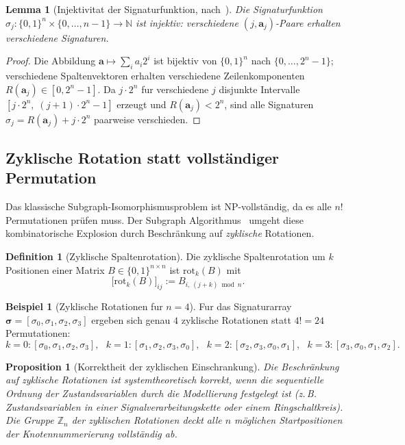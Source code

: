 \documentclass[a4paper, 12pt, twoside, openright]{report}
\newtheorem{lemma}[theorem]{Lemma}
\newtheorem{proposition}[theorem]{Proposition}
\theoremstyle{definition}
\newtheorem{definition}[theorem]{Definition}
\newtheorem{example}[theorem]{Beispiel}
\theoremstyle{definition}
\begin{document}
\begin{lemma}[Injektivitat der Signaturfunktion, nach~\citep{epp2026subgraph}]
\label{lem:injektivitaet}
Die Signaturfunktion $\sigma_j : \{0,1\}^n \times \{0,\ldots,n-1\} \to \mathbb{N}$
ist injektiv: verschiedene $(j, \bm{a}_j)$-Paare erhalten verschiedene Signaturen.
\end{lemma}

\begin{proof}
Die Abbildung $\bm{a} \mapsto \sum_i a_i 2^i$ ist bijektiv von $\{0,1\}^n$ nach
$\{0,\ldots,2^n-1\}$; verschiedene Spaltenvektoren erhalten verschiedene
Zeilenkomponenten $R(\bm{a}_j) \in [0, 2^n - 1]$.
Da $j \cdot 2^n$ fur verschiedene $j$ disjunkte Intervalle
$[j \cdot 2^n,\; (j+1) \cdot 2^n - 1]$ erzeugt und $R(\bm{a}_j) < 2^n$, sind
alle Signaturen $\sigma_j = R(\bm{a}_j) + j \cdot 2^n$ paarweise verschieden.
\end{proof}

\subsection{Zyklische Rotation statt vollständiger Permutation}

Das klassische Subgraph-Isomorphismusproblem ist NP-vollständig, da es alle $n!$
Permutationen prüfen muss. Der Subgraph Algorithmus~\citep{epp2026subgraph} umgeht
diese kombinatorische Explosion durch Beschränkung auf \emph{zyklische} Rotationen.

\begin{definition}[Zyklische Spaltenrotation]
\label{def:zyklrot}
Die zyklische Spaltenrotation um $k$ Positionen einer Matrix $B \in \{0,1\}^{n \times n}$
ist $\mathrm{rot}_k(B)$ mit
\begin{equation}
  \bigl[\mathrm{rot}_k(B)\bigr]_{ij} := B_{i,\,(j+k) \bmod n}.
  \label{eq:zyklrot}
\end{equation}
\end{definition}

\begin{example}[Zyklische Rotationen fur $n=4$]
Fur das Signaturarray $\bm{\sigma} = [\sigma_0, \sigma_1, \sigma_2, \sigma_3]$
ergeben sich genau $4$ zyklische Rotationen statt $4! = 24$ Permutationen:
\[
  k=0: [\sigma_0,\sigma_1,\sigma_2,\sigma_3], \text{ }
  k=1: [\sigma_1,\sigma_2,\sigma_3,\sigma_0], \text{ }
  k=2: [\sigma_2,\sigma_3,\sigma_0,\sigma_1], \text{ }
  k=3: [\sigma_3,\sigma_0,\sigma_1,\sigma_2].
\]
\end{example}

\begin{proposition}[Korrektheit der zyklischen Einschrankung]
\label{satz:zyklkorrekt}
Die Beschränkung auf zyklische Rotationen ist systemtheoretisch korrekt, wenn die
sequentielle Ordnung der Zustandsvariablen durch die Modellierung festgelegt ist
(z.\,B. Zustandsvariablen in einer Signalverarbeitungskette oder einem Ringschaltkreis).
Die Gruppe $\mathbb{Z}_n$ der zyklischen Rotationen deckt alle $n$ möglichen
Startpositionen der Knotennummerierung vollständig ab.
\end{proposition}
\end{document}
